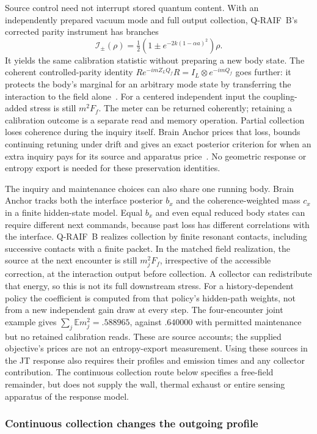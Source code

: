 Source control need not interrupt stored quantum content. With an independently
prepared vacuum mode and full output collection, Q-RAIF~B's corrected parity
instrument has branches
\[
 \mathcal I_\pm(\rho)=\tfrac12(1\pm e^{-2k(1-\alpha a)^2})\rho.
\]
It yields the same calibration statistic without preparing a new body state.
The coherent controlled-parity identity
$R e^{-imZ_LQ_f}R=I_L\otimes e^{-imQ_f}$ goes further: it protects
the body's marginal for an arbitrary mode state by transferring the interaction
to the field alone~\cite{Liu2026QRAIFB}. For a centered independent input the
coupling-added stress is still $m^2F_f$. The meter can be returned coherently;
retaining a calibration outcome is a separate read and memory operation.
Partial collection loses coherence during the inquiry itself. Brain Anchor
prices that loss, bounds continuing retuning under drift and gives an exact
posterior criterion for when an extra inquiry pays for its source and apparatus
price~\cite{BrainAnchor}. No geometric response or entropy export is needed
for these preservation identities.

The inquiry and maintenance choices can also share one running body.
Brain Anchor tracks both the interface posterior $b_x$ and the
coherence-weighted mass $c_x$ in a finite hidden-state model. Equal $b_x$
and even equal reduced body states can require different next commands,
because past loss has different correlations with the interface.
Q-RAIF~B realizes collection by finite resonant contacts, including successive
contacts with a finite packet. In the matched field realization, the source
at the next encounter is still $m_j^2F_f$, irrespective of the accessible
correction, at the interaction output before collection. A collector can
redistribute that energy, so this is not its full downstream stress.
For a history-dependent policy the coefficient is computed
from that policy's hidden-path weights, not from a new independent gain draw
at every step. The four-encounter joint example gives
$\sum_j\mathbb E m_j^2=.588965$, against $.640000$ with permitted
maintenance but no retained calibration reads. These are source accounts;
the supplied objective's prices are not an entropy-export measurement.
Using these sources in the JT response also requires their profiles and
emission times and any collector contribution. The continuous collection
route below specifies a free-field remainder, but does not supply the wall,
thermal exhaust or entire sensing apparatus of the response model.

\subsubsection{Continuous collection changes the outgoing profile}
\label{sec:band-source}

